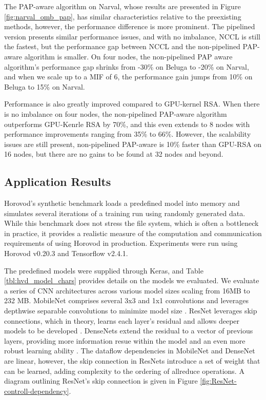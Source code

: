 The \gls{PAP}-aware algorithm on Narval, whose results are presented in Figure \ref{fig:narval_omb_pap}, has similar characteristics relative to the preexisting methods, however, the performance difference is more prominent.
The pipelined version presents similar performance issues, and with no imbalance, \gls{NCCL} is still the fastest, but the performance gap between \gls{NCCL} and the non-pipelined \gls{PAP}-aware algorithm is smaller.
On four nodes, the non-pipelined \gls{PAP} aware algorithm's performance gap shrinks from -30\% on Beluga to -20\% on Narval, and when we scale up to a \gls{MIF} of 6, the performance gain jumps from 10\% on Beluga to 15\% on Narval.

Performance is also greatly improved compared to GPU-kernel RSA.
When there is no imbalance on four nodes, the non-pipelined \gls{PAP}-aware algorithm outperforms \gls{GPU}-Kenrle \gls{RSA} by 70\%, and this even extends to 8 nodes with performance improvements ranging from 35\% to 66\%.
However, the scalability issues are still present, non-pipelined \gls{PAP}-aware is 10\% faster than \gls{GPU}-\gls{RSA} on 16 nodes, but there are no gains to be found at 32 nodes and beyond.

\subsection{Application Results}\label{sec:CH5-eval-horovod}
Horovod's synthetic benchmark loads a predefined model into memory and simulates several iterations of a training run using randomly generated data.
While this benchmark does not stress the file system, which is often a bottleneck in practice, it provides a realistic measure of the computation and communication requirements of using Horovod in production.
Experiments were run using Horovod v0.20.3 and Tensorflow v2.4.1.



The predefined models were supplied through Keras, and Table \ref{tbl:hvd_model_chars} provides details on the models we evaluated.
We evaluate a series of \gls{CNN} architectures across various model sizes scaling from 16MB to 232 MB.
MobileNet comprises several 3x3 and 1x1 convolutions and leverages depthwise separable convolutions to minimize model size \cite{Howard2017MobileNet}.
ResNet leverages skip connections, which in theory, learns each layer's residual and allows deeper models to be developed \cite{He2015ResNet}.
DenseNets extend the residual to a vector of previous layers, providing more information resue within the model and an even more robust learning ability \cite{Huang2016DenseNet}.
The dataflow dependencies in MobileNet and DenseNet are linear, however, the skip connection in ResNets introduce a set of weight that can be learned, adding complexity to the ordering of allreduce operations.
A diagram outlining ResNet's skip connection is given in Figure \ref{fig:ResNet-controll-dependency}.

